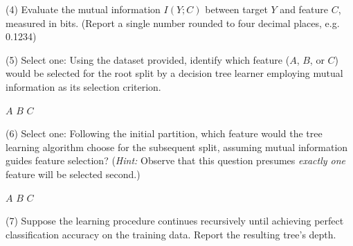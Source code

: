 \documentclass[11pt,addpoints,answers]{exam}
\begin{document}
\begin{questions}
		
		\item[(4)] Evaluate the mutual information \(I(Y; C)\) between target \(Y\) and feature \(C\), measured in bits. (Report a single number rounded to four decimal places, e.g. 0.1234)
		
		\begin{minipage}[t]{0.25\textwidth}
			\begin{answer_box}[title=$I(Y;C)$]
			\end{answer_box}
		\end{minipage}
		\begin{minipage}[t]{0.7\textwidth}
			\begin{answer_box}[title=Work]
			\end{answer_box}
		\end{minipage}
		
		
		\item[(5)] Select one: Using the dataset provided, identify which feature ($A$, $B$, or $C$) would be selected for the root split by a decision tree learner employing mutual information as its selection criterion.
		
		\begin{checkboxes}
			\choice $A$
			\choice $B$
			\choice $C$
		\end{checkboxes}
		
		
		\item[(6)] Select one: Following the initial partition, which feature would the tree learning algorithm choose for the subsequent split, assuming mutual information guides feature selection? (\emph{Hint:} Observe that this question presumes \emph{exactly one} feature will be selected second.)
		
		\begin{checkboxes}
			\choice $A$
			\choice $B$
			\choice $C$
		\end{checkboxes}
		
		
		\item[(7)] Suppose the learning procedure continues recursively until achieving perfect classification accuracy on the training data. Report the resulting tree's depth.
		
		\begin{minipage}[t]{0.25\textwidth}
			\begin{answer_box}[title=Depth]
			\end{answer_box}
		\end{minipage}
		

\end{questions}
\end{document}
